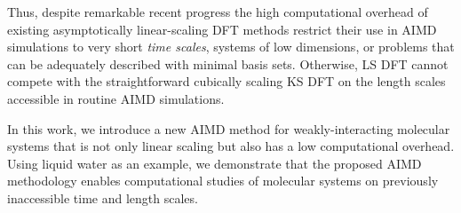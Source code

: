 \documentclass[aps,prl,reprint,amsmath,amssymb]{revtex4-1}
\begin{document}


Thus, despite remarkable recent progress the high computational overhead of existing asymptotically linear-scaling DFT methods restrict their use in AIMD simulations to very short \emph{time scales}, systems of low dimensions, or problems that can be adequately described with minimal basis sets. 
Otherwise, LS DFT cannot compete with the straightforward cubically scaling KS DFT on the length scales accessible in routine AIMD simulations.

In this work, we introduce a new AIMD method for weakly-interacting molecular systems that is not only linear scaling but also has a low computational overhead. 
Using liquid water as an example, we demonstrate that the proposed AIMD methodology enables computational studies of molecular systems on previously inaccessible time and length scales. 
\end{document}
